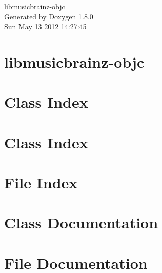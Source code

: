 \documentclass{book}
\begin{document}
\hypersetup{pageanchor=false,citecolor=blue}
\begin{titlepage}
\vspace*{7cm}
\begin{center}
{\Large libmusicbrainz-\/objc }\\
\vspace*{1cm}
{\large Generated by Doxygen 1.8.0}\\
\vspace*{0.5cm}
{\small Sun May 13 2012 14:27:45}\\
\end{center}
\end{titlepage}
\clearemptydoublepage
{}
\tableofcontents
\clearemptydoublepage
{}
\hypersetup{pageanchor=true,citecolor=blue}
\chapter{libmusicbrainz-\/objc}
\label{md_README}
\hypertarget{md_README}{}

\chapter{Class Index}

\chapter{Class Index}

\chapter{File Index}

\chapter{Class Documentation}










\chapter{File Documentation}




















\printindex
\end{document}
